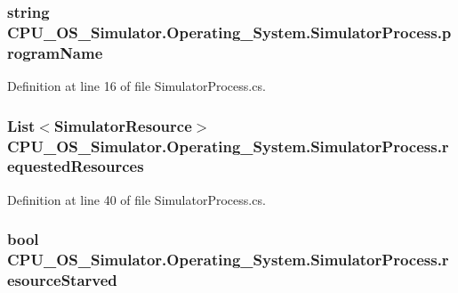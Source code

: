 \subsubsection[{program\+Name}]{\setlength{\rightskip}{0pt plus 5cm}string C\+P\+U\+\_\+\+O\+S\+\_\+\+Simulator.\+Operating\+\_\+\+System.\+Simulator\+Process.\+program\+Name\hspace{0.3cm}{\ttfamily [private]}}\label{class_c_p_u___o_s___simulator_1_1_operating___system_1_1_simulator_process_aacd55b65bf86395ae3c1a446d580030e}


Definition at line 16 of file Simulator\+Process.\+cs.

\hypertarget{class_c_p_u___o_s___simulator_1_1_operating___system_1_1_simulator_process_a9a1176ec569002f6779bcf894b4656ad}{}
\subsubsection[{requested\+Resources}]{\setlength{\rightskip}{0pt plus 5cm}List$<${\bf Simulator\+Resource}$>$ C\+P\+U\+\_\+\+O\+S\+\_\+\+Simulator.\+Operating\+\_\+\+System.\+Simulator\+Process.\+requested\+Resources\hspace{0.3cm}{\ttfamily [private]}}\label{class_c_p_u___o_s___simulator_1_1_operating___system_1_1_simulator_process_a9a1176ec569002f6779bcf894b4656ad}


Definition at line 40 of file Simulator\+Process.\+cs.

\hypertarget{class_c_p_u___o_s___simulator_1_1_operating___system_1_1_simulator_process_af4d819f0ae416b254b00d1926568b564}{}
\subsubsection[{resource\+Starved}]{\setlength{\rightskip}{0pt plus 5cm}bool C\+P\+U\+\_\+\+O\+S\+\_\+\+Simulator.\+Operating\+\_\+\+System.\+Simulator\+Process.\+resource\+Starved\hspace{0.3cm}{\ttfamily [private]}}\label{class_c_p_u___o_s___simulator_1_1_operating___system_1_1_simulator_process_af4d819f0ae416b254b00d1926568b564}


